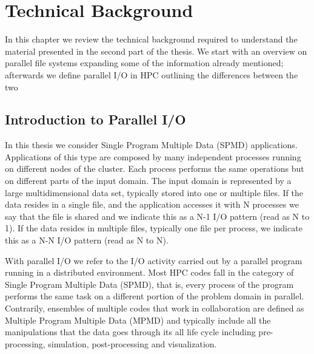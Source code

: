 \chapter{Technical Background} \label{chapter: mpio}
In this chapter we review the technical background required to understand the material presented in the second part of the thesis. We start with an overview on parallel file systems expanding some of the
information already mentioned; afterwards we define parallel I/O in HPC outlining the differences between the two

\section{Introduction to Parallel I/O}
In this thesis we consider Single Program Multiple Data (SPMD) applications. Applications of this type are composed by many independent processes running on different nodes of the cluster. Each process
performs the same operations but on different parts of the input domain. The input domain is represented by a large multidimensional data set, typically stored into one or multiple files. If the data
resides in a single file, and the application accesses it with N processes we say that the file is shared and we indicate this as a N-1 I/O pattern (read as N to 1). If the data resides in multiple files,
typically one file per process, we indicate this as a N-N I/O pattern (read as N to N).

With parallel I/O we refer to the I/O activity carried out by a parallel program running in a distributed environment. Most HPC codes fall in the category of Single Program Multiple Data (SPMD), that is, 
every process of the program performs the same task on a different portion of the problem domain in parallel. Contrarily, ensembles of multiple codes that work in collaboration are defined as Multiple Program 
Multiple Data (MPMD) and typically include all the manipulations that the data goes through its all life cycle including pre-processing, simulation, post-processing and visualization.
